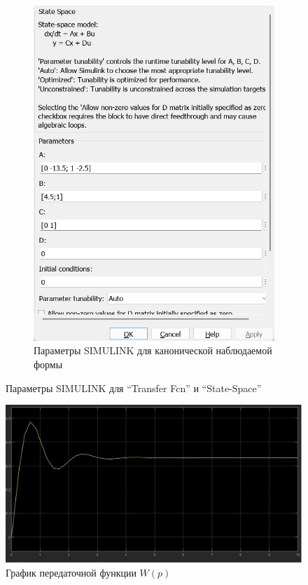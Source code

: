\documentclass[a4paper, 12pt]{article}
\begin{document}
\begin{figure}[H]
\begin{subfigure}{0.3\textwidth}
            \includegraphics[width=\linewidth]{canonical_observable_form_2_window.png}
            \caption{Параметры SIMULINK для канонической наблюдаемой формы}
            \label{fig:cof2w}
        \end{subfigure}
        \caption{Параметры SIMULINK для ``Transfer Fcn'' и ``State-Space''}
        \label{fig:windows2}
    \end{figure}
    \begin{figure}[H]
        \centering
        \includegraphics[scale=0.3]{W_p_2.jpg}
        \captionsetup{skip=0pt}
        \caption{График передаточной функции $W(p)$}
        \label{fig:wp2}
    \end{figure}
\end{document}
